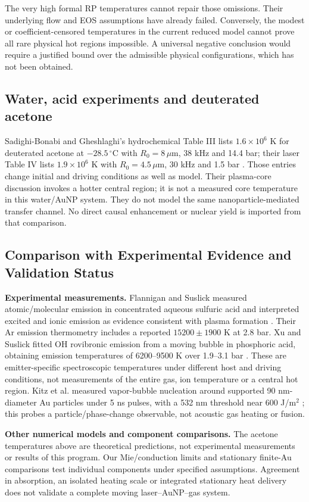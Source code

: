 \documentclass[11pt,a4paper]{article}
\begin{document}
The very high formal RP temperatures cannot repair those omissions. Their underlying flow and EOS assumptions have already failed. Conversely, the modest or coefficient-censored temperatures in the current reduced model cannot prove all rare physical hot regions impossible. A universal negative conclusion would require a justified bound over the admissible physical configurations, which has not been obtained.
\subsection{Water, acid experiments and deuterated acetone}
Sadighi-Bonabi and Gheshlaghi's hydrochemical Table III lists $1.6\times10^6$ K for deuterated acetone at $-28.5\,^{\circ}$C with $R_0=8\,\mu$m, 38 kHz and 14.4 bar; their laser Table IV lists $1.9\times10^6$ K with $R_0=4.5\,\mu$m, 30 kHz and 1.5 bar \cite{sadighi}. Those entries change initial and driving conditions as well as model. Their plasma-core discussion invokes a hotter central region; it is not a measured core temperature in this water/AuNP system. They do not model the same nanoparticle-mediated transfer channel. No direct causal enhancement or nuclear yield is imported from that comparison.

\clearpage
\subsection{Comparison with Experimental Evidence and Validation Status}\label{sec:experimental}
\textbf{Experimental measurements.} Flannigan and Suslick measured atomic/molecular emission in concentrated aqueous sulfuric acid and interpreted excited and ionic emission as evidence consistent with plasma formation \cite{flannigan}. Their Ar emission thermometry includes a reported $15200\pm1900$ K at 2.8 bar. Xu and Suslick fitted OH rovibronic emission from a moving bubble in phosphoric acid, obtaining emission temperatures of 6200--9500 K over 1.9--3.1 bar \cite{xu}. These are emitter-specific spectroscopic temperatures under different host and driving conditions, not measurements of the entire gas, ion temperature or a central hot region. Kitz et al. measured vapor-bubble nucleation around supported 90 nm-diameter Au particles under 5 ns pulses, with a 532 nm threshold near 600 J/m$^2$ \cite{kitz}; this probes a particle/phase-change observable, not acoustic gas heating or fusion.

\textbf{Other numerical models and component comparisons.} The acetone temperatures above are theoretical predictions, not experimental measurements or results of this program. Our Mie/conduction limits and stationary finite-Au comparisons test individual components under specified assumptions. Agreement in absorption, an isolated heating scale or integrated stationary heat delivery does not validate a complete moving laser--AuNP--gas system.
\end{document}
